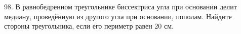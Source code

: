 98. В равнобедренном треугольнике биссектриса угла при основании делит медиану, проведённую из другого угла при основании, пополам. Найдите стороны треугольника, если его периметр равен 20 см.\\
